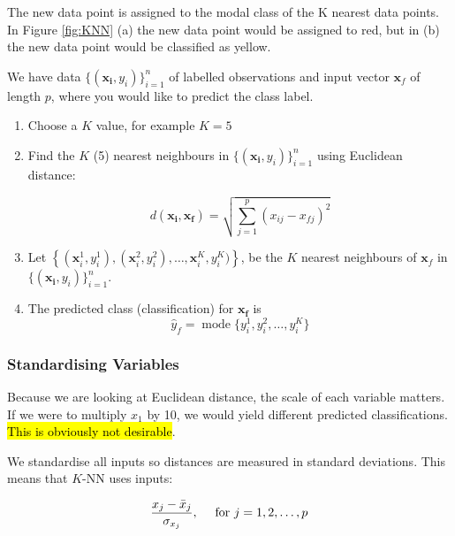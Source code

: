 \documentclass[11pt]{article}
\begin{document}
The new data point is assigned to the modal class of the K nearest data points. In Figure \ref{fig:KNN} (a) the new data point would be assigned to red, but in (b) the new data point would be classified as yellow.

\begin{algo}
    We have data $\{(\mathbf{x_i}, y_i)\}_{i=1}^n$ of labelled observations and input vector $\mathbf{x}_f$ of length $p$, where you would like to predict the class label.

    \begin{enumerate}
        \item Choose a $K$ value, for example $K=5$
        \item Find the $K$ (5) nearest neighbours in $\{(\mathbf{x_i}, y_i)\}_{i=1}^n$ using Euclidean distance:

        \begin{equation*}
            d(\mathbf{x_i, x_f}) = \sqrt{\sum_{j=1}^p (x_{ij}- x_{fj})^2}
        \end{equation*}
        \item Let $\left\{(\mathbf{x}_i^1, y_i^1), (\mathbf{x}_i^2, y_i^2), \ldots, \mathbf{x}_i^K, y_i^K)\right\}$, be the $K$ nearest neighbours of $\mathbf{x}_f$ in $\{(\mathbf{x_i}, y_i)\}_{i=1}^n$.
        \item The predicted class (classification) for $\mathbf{x_f}$ is
        \begin{equation*}
            \hat{y}_f = \operatorname{mode}\{y_i^1, y_i^2,\ldots, y_i^K\}
        \end{equation*}
    \end{enumerate}
\end{algo}

\subsubsection{Standardising Variables}

Because we are looking at Euclidean distance, the scale of each variable matters. If we were to multiply $x_1$ by 10, we would yield different predicted classifications. \hl{This is obviously not desirable}.

We standardise all inputs so distances are measured in standard deviations. This means that $K$-NN uses inputs:

\begin{equation*}
    \dfrac{x_j - \Bar{x}_j}{\sigma_{x_j}}, \quad \text{ for } j = 1, 2, \ldots, p
\end{equation*}
\end{document}

